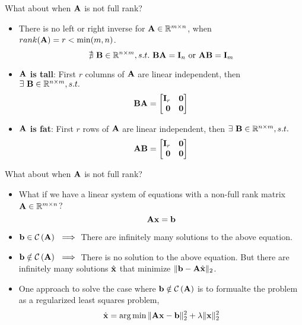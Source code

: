 \documentclass[aspectratio=169]{beamer}
\let\olditem\item
\renewcommand{\item}{\setlength{\itemsep}{\fill}\olditem}
\def\mf{\ensuremath\mathbf}
\def\mb{\ensuremath\mathbb}
\def\mc{\ensuremath\mathcal}
\def\lp{\ensuremath\left(}
\def\rp{\ensuremath\right)}
\def\bmx{\ensuremath\begin{bmatrix*}[r]}
\def\emx{\ensuremath\end{bmatrix*}}
\begin{document}
\begin{frame}[t]{What about when $\mf{A}$ is not full rank?}
\begin{itemize}
    \item There is no left or right inverse for $\mf{A} \in \mb{R}^{m \times n}$, when $rank(\mf{A}) = r < \min(m, n)$.
    \[ \nexists \,\, \mf{B} \in \mb{R}^{n \times m}, s.t. \,\, \mf{B}\mf{A} = \mf{I}_n \,\, \text{or} \,\, \mf{AB} = \mf{I}_m \]
    
    \item \textbf{$\mf{A}$ is tall}: First $r$ columns of $\mf{A}$ are linear independent, then  $\exists \,\, \mf{B} \in \mb{R}^{n \times m}, s.t.$
    \[\mf{BA} = \bmx \mf{I}_r & \mf{0} \\ \mf{0} & \mf{0} \emx \]
    
    \item \textbf{$\mf{A}$ is fat}: First $r$ rows of $\mf{A}$ are linear independent, then  $\exists \,\, \mf{B} \in \mb{R}^{n \times m}, s.t.$
    \[\mf{AB} = \bmx \mf{I}_r & \mf{0} \\ \mf{0} & \mf{0} \emx \]
    
\end{itemize}
\end{frame}


\begin{frame}[t]{What about when $\mf{A}$ is not full rank?}
\begin{itemize}
    \item What if we have a linear system of equations with a non-full rank matrix $\mf{A} \in \mb{R}^{m \times n}$?
    \[ \mf{Ax} = \mf{b} \]
    
    \item $\mf{b} \in \mathcal{C}\lp \mf{A} \rp \,\, \implies $ There are infinitely many solutions to the above equation.

    \item $\mf{b} \notin \mathcal{C}\lp \mf{A} \rp \,\, \implies $ There is no solution to the above equation. But there are infinitely many solutions $\hat{\mf{x}}$ that minimize $\Vert \mf{b} - \mf{A}\hat{\mf{x}} \Vert_2$.
    
    \item One approach to solve the case where $\mf{b} \notin \mc{C}\lp \mf{A} \rp$ is to formualte the problem as a regularized least squares problem,
    \[ \hat{\mf{x}} = \arg \min \Vert \mf{Ax} - \mf{b}\Vert_2^2 + \lambda \Vert \mf{x} \Vert_2^2 \]
\end{itemize}
\end{frame}
\end{document}
